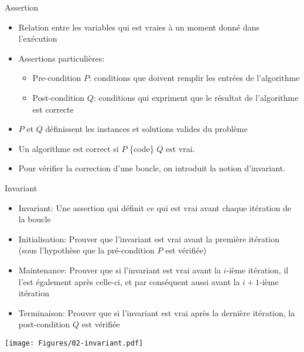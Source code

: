\begin{frame}{Assertion}

\begin{itemize}
\item Relation entre les variables qui est vraies à un moment donné dans l'exécution
\item Assertions particulières:
\begin{itemize}
\item Pre-condition $P$: conditions que doivent remplir les entrées de l'algorithme
\item Post-condition $Q$: conditions qui expriment que le résultat de l'algorithme est correcte
\end{itemize}
\item $P$ et $Q$ définissent les instances et solutions valides du problème
\item Un algorithme est correct si $P$ \{code\} $Q$ est vrai.
\item Pour vérifier la correction d'une boucle, on introduit la notion d'invariant.%
\end{itemize}

\end{frame}

\begin{frame}{Invariant}
\begin{itemize}
\item \alert{Invariant:} Une assertion qui définit ce qui est vrai avant chaque itération de la boucle
\item \alert{Initialisation:} Prouver que l'invariant est vrai avant la
  première itération (sous l'hypothèse que la pré-condition $P$ est
  vérifiée)
\item \alert{Maintenance:} Prouver que si l'invariant est vrai avant la
  $i$-ième itération, il l'est également après celle-ci, et par
  conséquent aussi avant la $i+1$-ième itération
\item \alert{Terminaison:} Prouver que si l'invariant est vrai après la
  dernière itération, la post-condition $Q$ est vérifiée
\end{itemize}

\centerline{\texttt{[image: Figures/02-invariant.pdf]}}

\end{frame}

